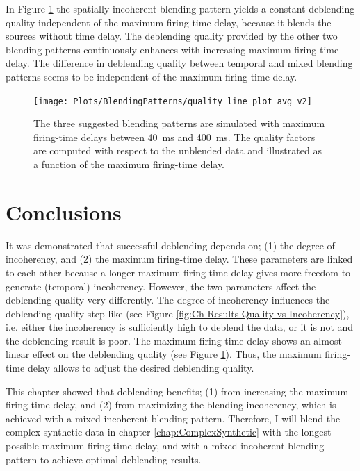 In Figure \ref{fig:Ch-Results-QualityFactors} the spatially incoherent blending pattern yields a constant deblending quality independent of the maximum firing-time delay, because it blends the sources without time delay. The deblending quality provided by the other two blending patterns continuously enhances with increasing maximum firing-time delay. The difference in deblending quality between temporal and mixed blending patterns seems to be independent of the maximum firing-time delay.

\begin{figure}
	\centering
	\texttt{[image: Plots/BlendingPatterns/quality\_line\_plot\_avg\_v2]}
	\caption{The three suggested blending patterns are simulated with maximum firing-time delays between \SI{40}{\milli\second} and \SI{400}{\milli\second}. The quality factors are computed with respect to the unblended data and illustrated as a function of the maximum firing-time delay.}
	\label{fig:Ch-Results-QualityFactors}
\end{figure}
			
			

\section{Conclusions}	\label{fig:Ch-Incoherency-Conclusions}

It was demonstrated that successful deblending depends on; (1) the degree of incoherency, and (2) the maximum firing-time delay. These parameters are linked to each other because a longer maximum firing-time delay gives more freedom to generate (temporal) incoherency. However, the two parameters affect the deblending quality very differently. The degree of incoherency influences the deblending quality step-like (see Figure \ref{fig:Ch-Results-Quality-vs-Incoherency}), i.e. either the incoherency is sufficiently high to deblend the data, or it is not and the deblending result is poor. The maximum firing-time delay shows an almost linear effect on the deblending quality (see Figure \ref{fig:Ch-Results-QualityFactors}). Thus, the maximum firing-time delay allows to adjust the desired deblending quality.

This chapter showed that deblending benefits; (1) from increasing the maximum firing-time delay, and (2) from maximizing the blending incoherency, which is achieved with a mixed incoherent blending pattern. Therefore, I will blend the complex synthetic data in chapter \ref{chap:ComplexSynthetic} with the longest possible maximum firing-time delay, and with a mixed incoherent blending pattern to achieve optimal deblending results.

